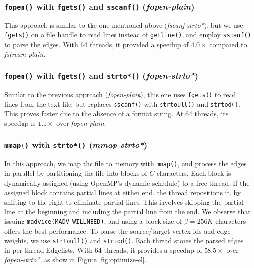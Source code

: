 


\subsubsection{\texttt{fopen()} with \texttt{fgets()} and \texttt{sscanf()} (\textit{fopen-plain})}
\label{sec:el-fopen-plain}

This approach is similar to the one mentioned above (\textit{fscanf-strto*}), but we use \texttt{fgets()} on a file handle to read lines instead of \texttt{getline()}, and employ \texttt{sscanf()} to parse the edges. With 64 threads, it provided a speedup of $4.0\times$ compared to \textit{fstream-plain}.


\subsubsection{\texttt{fopen()} with \texttt{fgets()} and \texttt{strto*()} (\textit{fopen-strto*})}
\label{sec:el-fopen-strto*}

Similar to the previous approach (\textit{fopen-plain}), this one uses \texttt{fgets()} to read lines from the text file, but replaces \texttt{sscanf()} with \texttt{strtoull()} and \texttt{strtod()}. This proves faster due to the absence of a format string. At 64 threads, its speedup is $1.1\times$ over \textit{fopen-plain}.


\subsubsection{\texttt{mmap()} with \texttt{strto*()} (\textit{mmap-strto*})}
\label{sec:el-mmap-strto*}

In this approach, we map the file to memory with \texttt{mmap()}, and process the edges in parallel by partitioning the file into blocks of $C$ characters. Each block is dynamically assigned (using OpenMP's dynamic schedule) to a free thread. If the assigned block contains partial lines at either end, the thread repositions it, by shifting to the right to eliminate partial lines. This involves skipping the partial line at the beginning and including the partial line from the end. We observe that issuing \texttt{madvice(MADV\_WILLNEED)}, and using a block size of $\beta=256K$ characters offers the best performance. To parse the source/target vertex ids and edge weights, we use \texttt{strtoull()} and \texttt{strtod()}. Each thread stores the parsed edges in per-thread Edgelists. With 64 threads, it provides a speedup of $58.5\times$ over \textit{fopen-strto*}, as show in Figure \ref{fig:optimize-el}.


